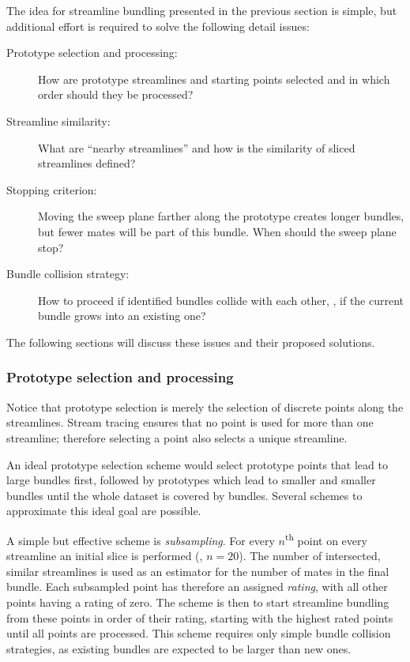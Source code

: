 The idea for streamline bundling presented in the previous section is simple, but additional effort is required to solve the following detail issues:
%
\begin{description}
%
  \item[Prototype selection and processing:] How are prototype streamlines and starting points selected and in which order should they be processed?
%
  \item[Streamline similarity:] What are ``nearby streamlines'' and how is the similarity of sliced streamlines defined?
%
  \item[Stopping criterion:] Moving the sweep plane farther along the prototype creates longer bundles, but fewer mates will be part of this bundle. When should the sweep plane stop?
%
  \item[Bundle collision strategy:] How to proceed if identified bundles collide with each other, \ie, if the current bundle grows into an existing one?
%
\end{description}

The following sections will discuss these issues and their proposed solutions.


\subsubsection{Prototype selection and processing}
\label{sec:theory:prototype-selection}

Notice that prototype selection is merely the selection of discrete points along the streamlines. Stream tracing ensures that no point is used for more than one streamline; therefore selecting a point also selects a unique streamline.

An ideal prototype selection scheme would select prototype points that lead to large bundles first, followed by prototypes which lead to smaller and smaller bundles until the whole dataset is covered by bundles. Several schemes to approximate this ideal goal are possible.

A simple but effective scheme is \emph{subsampling}. For every $n$\textsuperscript{th} point on every streamline an initial slice is performed (\eg, $n=20$). The number of intersected, similar streamlines is used as an estimator for the number of mates in the final bundle. Each subsampled point has therefore an assigned \emph{rating}, with all other points having a rating of zero. The scheme is then to start streamline bundling from these points in order of their rating, starting with the highest rated points until all points are processed. This scheme requires only simple bundle collision strategies, as existing bundles are expected to be larger than new ones.

